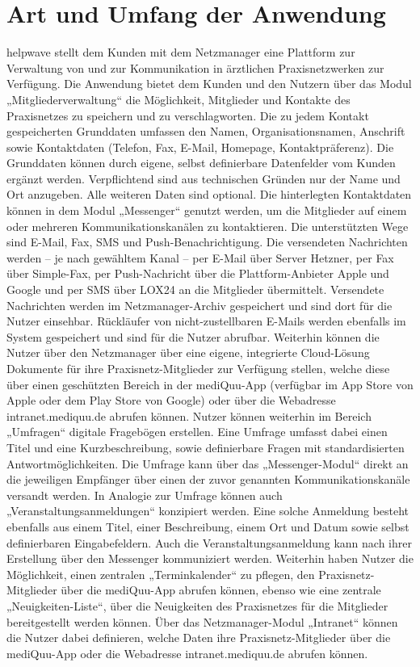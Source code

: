 \documentclass[10pt]{article}
\begin{document}
\section{Art und Umfang der Anwendung}
helpwave stellt dem Kunden mit dem Netzmanager eine Plattform zur Verwaltung von und zur Kommunikation in ärztlichen
Praxisnetzwerken zur Verfügung.
Die Anwendung bietet dem Kunden und den Nutzern über das Modul „Mitgliederverwaltung“ die Möglichkeit, Mitglieder
und Kontakte des Praxisnetzes zu speichern und zu verschlagworten. Die zu jedem Kontakt gespeicherten Grunddaten umfassen den Namen, Organisationsnamen, Anschrift sowie Kontaktdaten (Telefon, Fax, E-Mail, Homepage, Kontaktpräferenz).
Die Grunddaten können durch eigene, selbst definierbare Datenfelder vom Kunden ergänzt werden. Verpflichtend sind aus
technischen Gründen nur der Name und Ort anzugeben. Alle weiteren Daten sind optional.
Die hinterlegten Kontaktdaten können in dem Modul „Messenger“ genutzt werden, um die Mitglieder auf einem oder mehreren Kommunikationskanälen zu kontaktieren. Die unterstützten Wege sind E-Mail, Fax, SMS und Push-Benachrichtigung.
Die versendeten Nachrichten werden – je nach gewähltem Kanal – per E-Mail über Server Hetzner, per Fax über
Simple-Fax, per Push-Nachricht über die Plattform-Anbieter Apple und Google und per SMS über LOX24 an die Mitglieder
übermittelt.
Versendete Nachrichten werden im Netzmanager-Archiv gespeichert und sind dort für die Nutzer einsehbar. Rückläufer von
nicht-zustellbaren E-Mails werden ebenfalls im System gespeichert und sind für die Nutzer abrufbar. Weiterhin können die
Nutzer über den Netzmanager über eine eigene, integrierte Cloud-Lösung Dokumente für ihre Praxisnetz-Mitglieder zur
Verfügung stellen, welche diese über einen geschützten Bereich in der mediQuu-App (verfügbar im App Store von Apple
oder dem Play Store von Google) oder über die Webadresse intranet.mediquu.de abrufen können. Nutzer können weiterhin
im Bereich „Umfragen“ digitale Fragebögen erstellen. Eine Umfrage umfasst dabei einen Titel und eine Kurzbeschreibung,
sowie definierbare Fragen mit standardisierten Antwortmöglichkeiten. Die Umfrage kann über das „Messenger-Modul“
direkt an die jeweiligen Empfänger über einen der zuvor genannten Kommunikationskanäle versandt werden. In Analogie
zur Umfrage können auch „Veranstaltungsanmeldungen“ konzipiert werden. Eine solche Anmeldung besteht ebenfalls aus einem Titel, einer Beschreibung, einem Ort und Datum sowie selbst definierbaren Eingabefeldern. Auch die Veranstaltungsanmeldung kann nach ihrer Erstellung über den Messenger kommuniziert werden. Weiterhin haben Nutzer die Möglichkeit,
einen zentralen „Terminkalender“ zu pflegen, den Praxisnetz-Mitglieder über die mediQuu-App abrufen können, ebenso wie
eine zentrale „Neuigkeiten-Liste“, über die Neuigkeiten des Praxisnetzes für die Mitglieder bereitgestellt werden können.
Über das Netzmanager-Modul „Intranet“ können die Nutzer dabei definieren, welche Daten ihre Praxisnetz-Mitglieder über
die mediQuu-App oder die Webadresse intranet.mediquu.de abrufen können.
\end{document}
